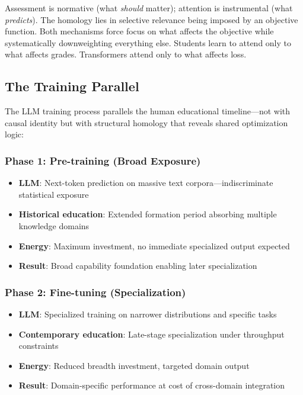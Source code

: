 Assessment is normative (what \textit{should} matter); attention is instrumental (what \textit{predicts}). The homology lies in selective relevance being imposed by an objective function. Both mechanisms force focus on what affects the objective while systematically downweighting everything else. Students learn to attend only to what affects grades. Transformers attend only to what affects loss.

\subsection{The Training Parallel}

The LLM training process parallels the human educational timeline---not with causal identity but with structural homology that reveals shared optimization logic:

\subsubsection{Phase 1: Pre-training (Broad Exposure)}
\begin{itemize}
\item \textbf{LLM}: Next-token prediction on massive text corpora---indiscriminate statistical exposure
\item \textbf{Historical education}: Extended formation period absorbing multiple knowledge domains
\item \textbf{Energy}: Maximum investment, no immediate specialized output expected
\item \textbf{Result}: Broad capability foundation enabling later specialization
\end{itemize}

\subsubsection{Phase 2: Fine-tuning (Specialization)}
\begin{itemize}
\item \textbf{LLM}: Specialized training on narrower distributions and specific tasks
\item \textbf{Contemporary education}: Late-stage specialization under throughput constraints
\item \textbf{Energy}: Reduced breadth investment, targeted domain output
\item \textbf{Result}: Domain-specific performance at cost of cross-domain integration
\end{itemize}

